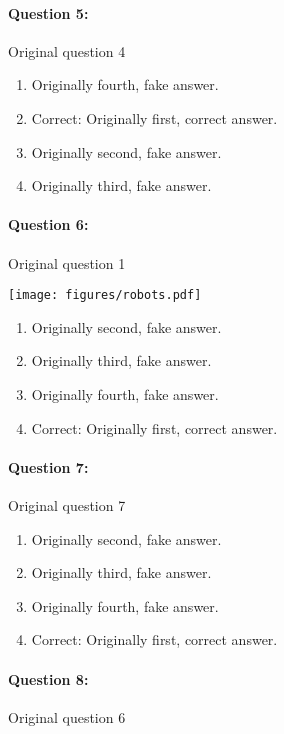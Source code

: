 \documentclass[9pt, twoside, twocolumn]{extarticle}
\renewcommand{\includegraphics}[2][]{\OldIncludegraphics[width=\linewidth, #1]{#2}}
\renewcommand{\caption}{}
\let\origfigure=\figure
\let\endorigfigure=\endfigure
\renewenvironment{figure}[1][]{%
  \origfigure[H]
}{%
  \endorigfigure
}
\begin{document}
\paragraph{Question 5:}
Original question 4

\begin{enumerate}[label=\textbf{{\Alph*}},labelindent=0pt, labelsep=1.5em, parsep=0.2em]
\item Originally fourth, fake answer.
\item Correct: Originally first, correct answer.
\item Originally second, fake answer.
\item Originally third, fake answer.
\end{enumerate}
\paragraph{Question 6:}
Original question 1

\begin{figure}\centering
\texttt{[image: figures/robots.pdf]}
\caption{\end{figure}
\begin{enumerate}[label=\textbf{{\Alph*}},labelindent=0pt, labelsep=1.5em, parsep=0.2em]
\item Originally second, fake answer.
\item Originally third, fake answer.
\item Originally fourth, fake answer.
\item Correct: Originally first, correct answer.
\end{enumerate}
\paragraph{Question 7:}
Original question 7

\begin{enumerate}[label=\textbf{{\Alph*}},labelindent=0pt, labelsep=1.5em, parsep=0.2em]
\item Originally second, fake answer.
\item Originally third, fake answer.
\item Originally fourth, fake answer.
\item Correct: Originally first, correct answer.
\end{enumerate}
\paragraph{Question 8:}
Original question 6
\end{document}

